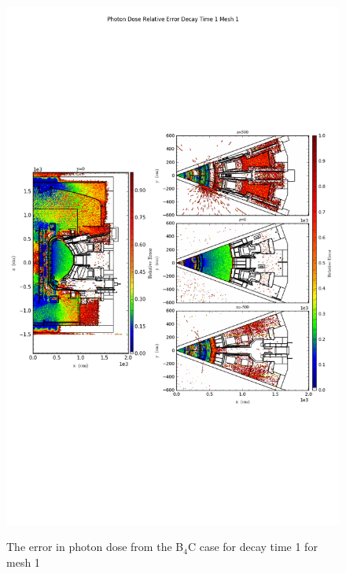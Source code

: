 \begin{figure}[ht!]
\centering
\includegraphics[trim={0cm 9cm 0cm 10cm},clip,scale=0.75]{../plots/final_model_nob4c/Photon_Dose_Relative_Error_Decay_Time_1_Mesh_1.png}
\label{fig:photons_dc1_no4bc_m1_error}
\caption{The error in photon dose from the B$_4$C case for decay time 1 for mesh 1}
\end{figure}
